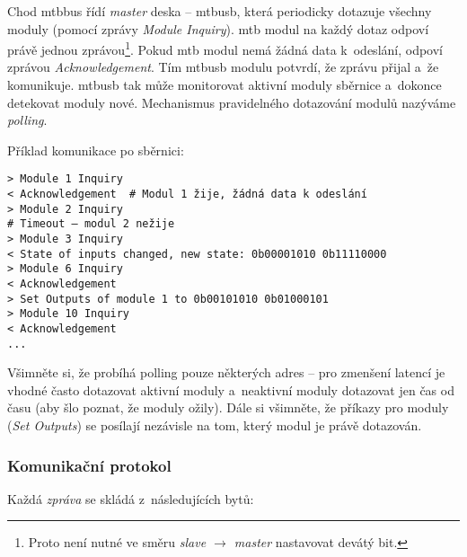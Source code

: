 Chod \gls{mtbbus} řídí \textit{master} deska – \gls{mtbusb},
která periodicky dotazuje všechny moduly (pomocí zprávy
\textit{Module Inquiry}). \gls{mtb} modul na každý dotaz odpoví právě jednou
zprávou\footnote{Proto není nutné ve směru \textit{slave $\rightarrow$ master}
nastavovat devátý bit.}.  Pokud \gls{mtb} modul nemá žádná data k~odeslání,
odpoví zprávou \textit{Acknowledgement}. Tím \gls{mtbusb} modulu potvrdí, že
zprávu přijal a~že komunikuje. \gls{mtbusb} tak může monitorovat aktivní moduly
sběrnice a~dokonce detekovat moduly nové. Mechanismus pravidelného dotazování
modulů nazýváme \textit{polling}.

Příklad komunikace po sběrnici:

\begin{verbatim}
> Module 1 Inquiry
< Acknowledgement  # Modul 1 žije, žádná data k odeslání
> Module 2 Inquiry
# Timeout – modul 2 nežije
> Module 3 Inquiry
< State of inputs changed, new state: 0b00001010 0b11110000
> Module 6 Inquiry
< Acknowledgement
> Set Outputs of module 1 to 0b00101010 0b01000101
> Module 10 Inquiry
< Acknowledgement
...
\end{verbatim}

Všimněte si, že probíhá polling pouze některých adres – pro zmenšení latencí je
vhodné často dotazovat aktivní moduly a~neaktivní moduly dotazovat jen čas od
času (aby šlo poznat, že moduly ožily). Dále si všimněte, že příkazy pro
moduly (\textit{Set Outputs}) se posílají nezávisle na tom, který modul je
právě dotazován.

\subsubsection{\textbf{Komunikační protokol}} \label{subsub:mtbbus-proto-strucure}

Každá \textit{zpráva} se skládá z~následujících bytů:

